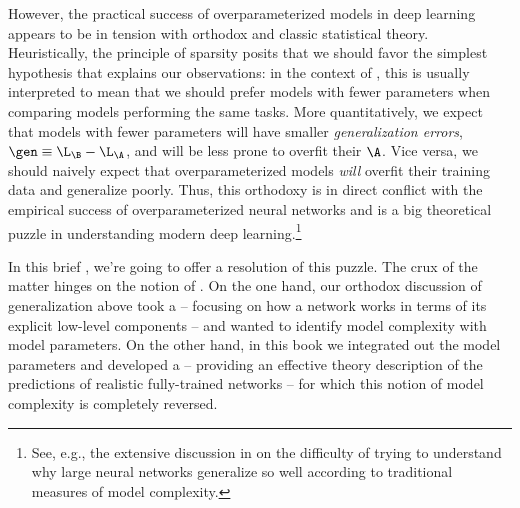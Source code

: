 However, the practical success of overparameterized models in deep learning appears to be in tension with orthodox  and classic statistical theory. 
Heuristically, the  principle of sparsity
posits that we should favor the simplest hypothesis that explains our observations:
in the context of  
, this is usually interpreted to mean that we should prefer models with fewer parameters when comparing models 
performing the same tasks.
More quantitatively, we expect that models with fewer parameters will have smaller \emph{generalization errors},
$\gen \equiv \L_\B - \L_\A$, %
and will be less prone to overfit their  $\A$.
Vice versa, we should naively expect that overparameterized models 
\emph{will} overfit their training data and generalize poorly. Thus, this orthodoxy is in direct conflict with the empirical success of overparameterized neural networks and 
is a big
theoretical puzzle in understanding modern deep learning.\footnote{
    See, e.g., the extensive discussion in \cite{zhang2016understanding} on the difficulty of trying to understand why large neural networks generalize so well according to traditional measures of model complexity.
}









In this 
brief
, we're going to
offer a resolution of this puzzle.
The crux of the matter hinges on the notion of . 
On the one hand, our orthodox discussion of
generalization above took a  -- focusing on how a network works in terms of its explicit low-level components -- and wanted to 
identify model complexity with model parameters.
On the other hand, in this book 
we integrated out the model parameters and
developed 
a   -- providing an effective theory description of 
the predictions of
realistic fully-trained networks -- for which this notion of model complexity is completely reversed.


